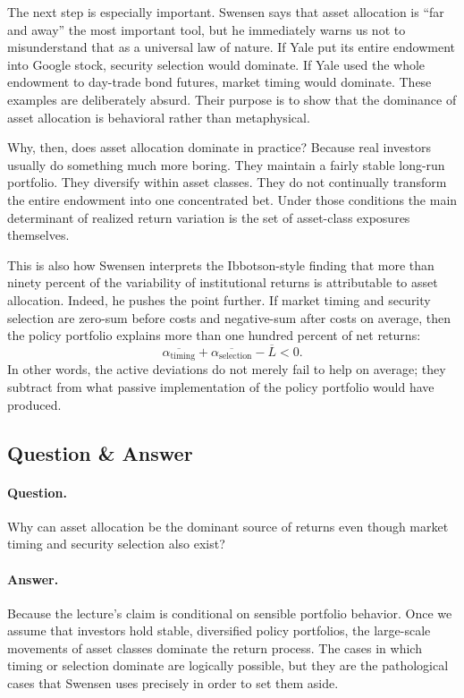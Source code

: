 The next step is especially important. Swensen says that asset allocation is ``far and away'' the most important tool, but he immediately warns us not to misunderstand that as a universal law of nature. If Yale put its entire endowment into Google stock, security selection would dominate. If Yale used the whole endowment to day-trade bond futures, market timing would dominate. These examples are deliberately absurd. Their purpose is to show that the dominance of asset allocation is behavioral rather than metaphysical.

Why, then, does asset allocation dominate in practice? Because real investors usually do something much more boring. They maintain a fairly stable long-run portfolio. They diversify within asset classes. They do not continually transform the entire endowment into one concentrated bet. Under those conditions the main determinant of realized return variation is the set of asset-class exposures themselves.

This is also how Swensen interprets the Ibbotson-style finding that more than ninety percent of the variability of institutional returns is attributable to asset allocation. Indeed, he pushes the point further. If market timing and security selection are zero-sum before costs and negative-sum after costs on average, then the policy portfolio explains more than one hundred percent of net returns:
\begin{equation}
\overline{\alpha_{\text{timing}}}+\overline{\alpha_{\text{selection}}}-\overline{L}<0.
\end{equation}
In other words, the active deviations do not merely fail to help on average; they subtract from what passive implementation of the policy portfolio would have produced.

\subsection{Question \& Answer}

\paragraph{Question.} Why can asset allocation be the dominant source of returns even though market timing and security selection also exist?

\paragraph{Answer.} Because the lecture's claim is conditional on sensible portfolio behavior. Once we assume that investors hold stable, diversified policy portfolios, the large-scale movements of asset classes dominate the return process. The cases in which timing or selection dominate are logically possible, but they are the pathological cases that Swensen uses precisely in order to set them aside.

